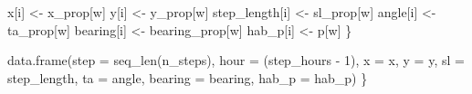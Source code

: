 \documentclass[
  letterpaper,
  DIV=11,
  numbers=noendperiod]{scrartcl}
\newenvironment{Shaded}{\begin{snugshade}}{\end{snugshade}}
\newcommand{\AttributeTok}[1]{\textcolor[rgb]{0.40,0.45,0.13}{#1}}
\newcommand{\DecValTok}[1]{\textcolor[rgb]{0.68,0.00,0.00}{#1}}
\newcommand{\FunctionTok}[1]{\textcolor[rgb]{0.28,0.35,0.67}{#1}}
\newcommand{\NormalTok}[1]{\textcolor[rgb]{0.00,0.23,0.31}{#1}}
\newcommand{\OtherTok}[1]{\textcolor[rgb]{0.00,0.23,0.31}{#1}}
\newcommand{\SpecialCharTok}[1]{\textcolor[rgb]{0.37,0.37,0.37}{#1}}
\begin{document}
\begin{Shaded}
\begin{Highlighting}[]
\NormalTok{    x[i] }\OtherTok{\textless{}{-}}\NormalTok{ x\_prop[w]}
\NormalTok{    y[i] }\OtherTok{\textless{}{-}}\NormalTok{ y\_prop[w]}
\NormalTok{    step\_length[i] }\OtherTok{\textless{}{-}}\NormalTok{ sl\_prop[w]}
\NormalTok{    angle[i]   }\OtherTok{\textless{}{-}}\NormalTok{ ta\_prop[w]}
\NormalTok{    bearing[i] }\OtherTok{\textless{}{-}}\NormalTok{ bearing\_prop[w]}
\NormalTok{    hab\_p[i]   }\OtherTok{\textless{}{-}}\NormalTok{ p[w]}
\NormalTok{  \}}

  \FunctionTok{data.frame}\NormalTok{(}\AttributeTok{step =} \FunctionTok{seq\_len}\NormalTok{(n\_steps),}
             \AttributeTok{hour =}\NormalTok{ (step\_hours }\SpecialCharTok{{-}} \DecValTok{1}\NormalTok{),}
             \AttributeTok{x =}\NormalTok{ x, }\AttributeTok{y =}\NormalTok{ y,}
             \AttributeTok{sl =}\NormalTok{ step\_length, }\AttributeTok{ta =}\NormalTok{ angle, }\AttributeTok{bearing =}\NormalTok{ bearing,}
             \AttributeTok{hab\_p =}\NormalTok{ hab\_p)}
\NormalTok{\}}
\end{Highlighting}
\end{Shaded}
\end{document}
